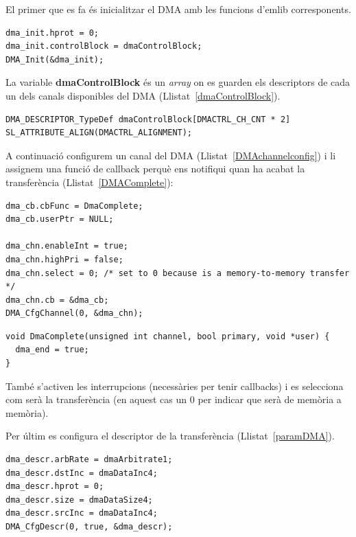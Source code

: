 El primer que es fa és inicialitzar el DMA amb les funcions d'emlib corresponents.
\begin{lstlisting}[caption={Inicialització del DMA},style=customc]
dma_init.hprot = 0;
dma_init.controlBlock = dmaControlBlock;
DMA_Init(&dma_init);
\end{lstlisting}

La variable {\bf dmaControlBlock} és un {\em array} on es guarden els descriptors de cada un dels canals disponibles del DMA (Llistat~\ref{dmaControlBlock}).
\begin{lstlisting}[style=customc, caption={Definició de la variable {\bf dmaControlBlock}}, label=dmaControlBlock]
DMA_DESCRIPTOR_TypeDef dmaControlBlock[DMACTRL_CH_CNT * 2] SL_ATTRIBUTE_ALIGN(DMACTRL_ALIGNMENT);
\end{lstlisting}

A continuació configurem un canal del DMA (Llistat~\ref{DMAchannelconfig}) i li assignem una funció de \gls{callback} perquè ens notifiqui quan ha acabat la transferència (Llistat~\ref{DMAComplete}):
\begin{lstlisting}[style=customc, caption={Configuració del canal DMA}, label=DMAchannelconfig]
dma_cb.cbFunc = DmaComplete;
dma_cb.userPtr = NULL;

dma_chn.enableInt = true;
dma_chn.highPri = false;
dma_chn.select = 0; /* set to 0 because is a memory-to-memory transfer */
dma_chn.cb = &dma_cb;
DMA_CfgChannel(0, &dma_chn);
\end{lstlisting}

\begin{lstlisting}[style=customc,caption={Callback del DMA {\bf DmaComplete()}\index{DmaComplete()}},label=DMAComplete]
void DmaComplete(unsigned int channel, bool primary, void *user) {
  dma_end = true;
}
\end{lstlisting}
També s'activen les interrupcions (necessàries per tenir \glspl{callback}) i es selecciona com serà la transferència (en aquest cas un 0 per indicar que serà de memòria a memòria).

Per últim es configura el descriptor de la transferència (Llistat~\ref{paramDMA}).
\begin{lstlisting}[style=customc, caption={Paràmetres de configuració del DMA}, label=paramDMA]
dma_descr.arbRate = dmaArbitrate1;
dma_descr.dstInc = dmaDataInc4;
dma_descr.hprot = 0;
dma_descr.size = dmaDataSize4;
dma_descr.srcInc = dmaDataInc4;
DMA_CfgDescr(0, true, &dma_descr);
\end{lstlisting}


